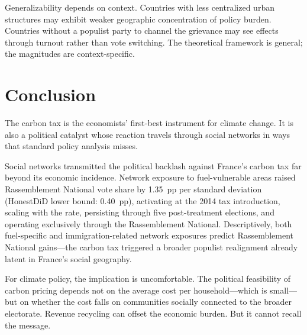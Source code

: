 \documentclass[12pt]{article}
\newcommand{\rn}{Rassemblement National}
\begin{document}
Generalizability depends on context. Countries with less centralized urban structures may exhibit weaker geographic concentration of policy burden. Countries without a populist party to channel the grievance may see effects through turnout rather than vote switching. The theoretical framework is general; the magnitudes are context-specific.



\section{Conclusion}
\label{sec:conclusion}

The carbon tax is the economists' first-best instrument for climate change. It is also a political catalyst whose reaction travels through social networks in ways that standard policy analysis misses.

Social networks transmitted the political backlash against France's carbon tax far beyond its economic incidence. Network exposure to fuel-vulnerable areas raised \rn{} vote share by 1.35~pp per standard deviation (HonestDiD lower bound: 0.40~pp), activating at the 2014 tax introduction, scaling with the rate, persisting through five post-treatment elections, and operating exclusively through the \rn{}. Descriptively, both fuel-specific and immigration-related network exposures predict \rn{} gains---the carbon tax triggered a broader populist realignment already latent in France's social geography.

For climate policy, the implication is uncomfortable. The political feasibility of carbon pricing depends not on the average cost per household---which is small---but on whether the cost falls on communities socially connected to the broader electorate. Revenue recycling can offset the economic burden. But it cannot recall the message.

\label{apep_main_text_end}





\end{document}

